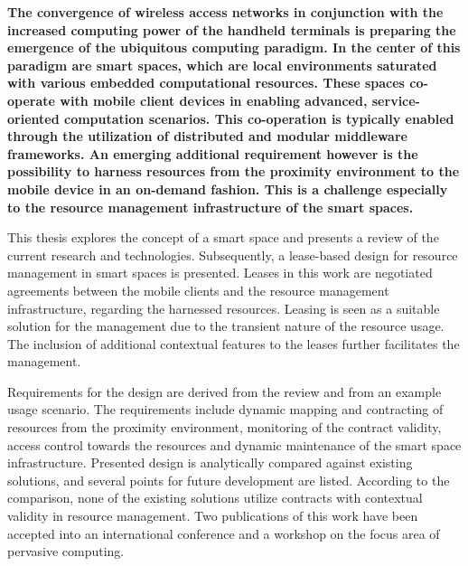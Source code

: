 {\DIFaddbegin \bfseries \DIFaddend \noindent \DIFdelbegin %
\DIFdelend The convergence of wireless access networks in conjunction with the increased computing power of the handheld terminals is preparing the emergence of the ubiquitous computing paradigm. In the center of this paradigm are smart spaces, which are local environments saturated with various embedded computational resources. These spaces co-operate with mobile client devices in enabling advanced, service-oriented computation scenarios. This co-operation is typically enabled through the utilization of distributed and modular middleware frameworks. An emerging additional requirement however is the possibility to harness resources from the proximity environment to the mobile device in an on-demand fashion. This is a challenge especially to the resource management infrastructure of the smart spaces.

This thesis explores the concept of a smart space and presents a review of the current research and technologies. Subsequently, a lease-based design for resource management in smart spaces is presented. Leases in this work are negotiated agreements between the mobile clients and the resource management infrastructure, regarding the harnessed resources. Leasing is seen as a suitable solution for the management due to the transient nature of the resource usage. The inclusion of additional contextual features to the leases further facilitates the management.

Requirements for the design are derived from the review and from an example usage scenario. The requirements include dynamic mapping and contracting of resources from the proximity environment, monitoring of the contract validity, access control towards the resources and dynamic maintenance of the smart space infrastructure. Presented design is analytically compared against existing solutions, and several points for future development are listed. According to the comparison, none of the existing solutions utilize contracts with contextual validity in resource management. Two publications of this work have been accepted into an international conference and a workshop on the focus area of pervasive computing.
\DIFdelbegin %
\DIFdelend 

\DIFdelbegin %
\DIFdelend \DIFaddbegin \vspace{1\baselineskip}
\noindent\textbf{}
\DIFaddend }
